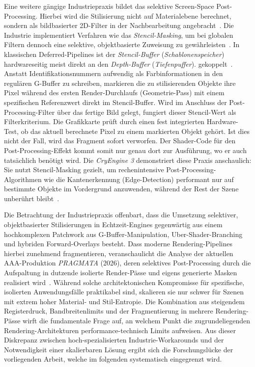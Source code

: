 Eine weitere gängige Industriepraxis bildet das selektive Screen-Space Post-Processing.
Hierbei wird die Stilisierung nicht auf Materialebene berechnet, sondern als bildbasierter 2D-Filter
in der Nachbearbeitung angebracht~\cite[S.~661]{akenine-mollerRealtimeRendering2019}.
Die Industrie implementiert Verfahren wie das \textit{Stencil-Masking}, um bei globalen Filtern dennoch eine selektive,
objektbasierte Zuweisung zu gewährleisten~\cite[S.~81]{AdvancesRealTimeRendering}.
In klassischen Deferred-Pipelines ist der \textit{Stencil-Buffer} (\textit{Schablonenspeicher}) hardwareseitig meist
direkt an den \textit{Depth-Buffer} (\textit{Tiefenpuffer}).
gekoppelt~\cite[Folie~\enquote{\ac{G-Buffer}: Our approach}]{valientDeferredRenderingKillzone}.
Anstatt Identifikationsnummern aufwendig als Farbinformationen in den regulären \ac{G-Buffer} zu schreiben, markieren die zu
stilisierenden Objekte ihre Pixel während des ersten Render-Durchlaufs (Geometrie-Pass) mit einem spezifischen
Referenzwert direkt im Stencil-Buffer.
Wird im Anschluss der Post-Processing-Filter über das fertige Bild gelegt, fungiert dieser Stencil-Wert als
Filterkriterium.
Die Grafikkarte prüft durch einen fest integrierten Hardware-Test, ob das aktuell berechnete Pixel zu einem markierten
Objekt gehört.
Ist dies nicht der Fall, wird das Fragment sofort verworfen.
Der Shader-Code für den Post-Processing-Effekt kommt somit nur genau dort zur Ausführung, wo er auch tatsächlich
benötigt wird.
Die \textit{CryEngine 3} demonstriert diese Praxis anschaulich: Sie nutzt Stencil-Masking gezielt, um rechenintensive
Post-Processing-Algorithmen wie die Kantenerkennung (Edge-Detection) performant nur auf bestimmte Objekte im
Vordergrund anzuwenden, während der Rest der Szene unberührt
bleibt~\cite[S.~81]{AdvancesRealTimeRendering}.

Die Betrachtung der Industriepraxis offenbart, dass die Umsetzung selektiver, objektbasierter Stilisierungen in
Echtzeit-Engines gegenwärtig aus einem hochkomplexen Patchwork aus \ac{G-Buffer}-Manipulation, Uber-Shader-Branching und
hybriden Forward-Overlays besteht.
Dass moderne Rendering-Pipelines hierbei zunehmend fragmentieren, veranschaulicht die Analyse der aktuellen
AAA-Produktion \textit{PRAGMATA} (2026), deren selektives Post-Processing durch die Aufspaltung in dutzende isolierte
Render-Pässe und eigens generierte Masken realisiert
wird~\cite[Abschn.~\enquote{Frame}]{muhammadPrettyFramesPRAGMATA2026}.
Während solche architektonischen Kompromisse für spezifische, isolierten Anwendungsfälle praktikabel sind, skalieren
sie nur schwer für Szenen mit extrem hoher Material- und Stil-Entropie.
Die Kombination aus steigendem Registerdruck, Bandbreitenlimits und der Fragmentierung in mehrere Rendering-Pässe wirft
die fundamentale Frage auf, an welchem Punkt die zugrundeliegenden Rendering-Architekturen performance-technisch
Limits aufweisen.
Aus dieser Diskrepanz zwischen hoch-spezialisierten Industrie-Workarounds und der Notwendigkeit einer skalierbaren
Lösung ergibt sich die Forschungslücke der vorliegenden Arbeit, welche im folgenden systematisch eingegrenzt wird.


